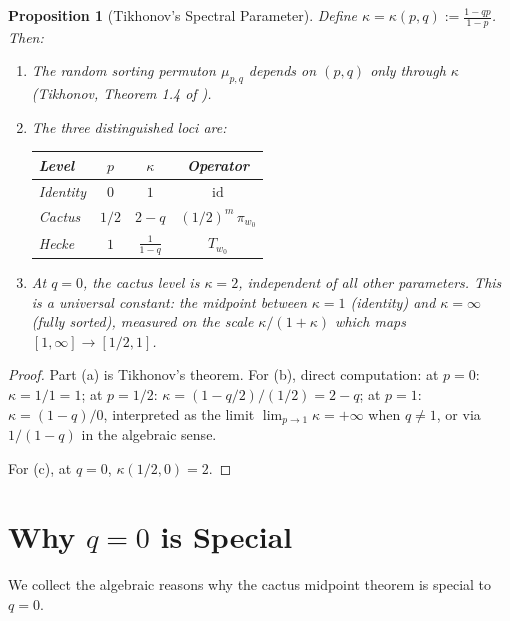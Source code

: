 \documentclass[11pt]{article}
\newtheorem{proposition}[theorem]{Proposition}
\theoremstyle{definition}
\theoremstyle{remark}
\DeclareMathOperator{\id}{id}
\begin{document}
\begin{proposition}[Tikhonov's Spectral Parameter]\label{prop:kappa}
Define $\kappa = \kappa(p,q) := \frac{1-qp}{1-p}$. Then:
\begin{enumerate}
\item[(a)] The random sorting permuton $\mu_{p,q}$ depends on $(p,q)$
  only through $\kappa$ (Tikhonov, Theorem 1.4 of \cite{tikhonov}).
\item[(b)] The three distinguished loci are:
\begin{center}
\begin{tabular}{lccc}
\hline
Level & $p$ & $\kappa$ & Operator \\
\hline
Identity & $0$ & $1$ & $\id$ \\
Cactus & $1/2$ & $2 - q$ & $(1/2)^m\,\pi_{w_0}$ \\
Hecke & $1$ & $\frac{1}{1-q}$ & $T_{w_0}$ \\
\hline
\end{tabular}
\end{center}
\item[(c)] At $q = 0$, the cactus level is $\kappa = 2$, independent of
  all other parameters. This is a universal constant: the midpoint between
  $\kappa = 1$ (identity) and $\kappa = \infty$ (fully sorted), measured
  on the scale $\kappa/(1+\kappa)$ which maps $[1,\infty] \to [1/2, 1]$.
\end{enumerate}
\end{proposition}

\begin{proof}
Part (a) is Tikhonov's theorem. For (b), direct computation:
at $p = 0$: $\kappa = 1/1 = 1$;
at $p = 1/2$: $\kappa = (1 - q/2)/(1/2) = 2 - q$;
at $p = 1$: $\kappa = (1-q)/0$, interpreted as the limit $\lim_{p \to 1} \kappa = +\infty$ when $q \neq 1$, or via $1/(1-q)$ in the algebraic sense.

For (c), at $q = 0$, $\kappa(1/2, 0) = 2$.
\end{proof}

\section{Why $q = 0$ is Special}

We collect the algebraic reasons why the cactus midpoint theorem is
special to $q = 0$.
\end{document}
